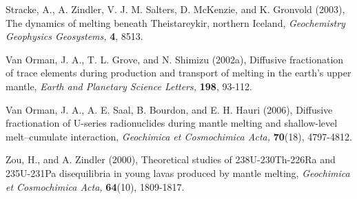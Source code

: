 \documentclass[11pt]{article}
\begin{document}
Stracke, A., A. Zindler, V. J. M. Salters, D. McKenzie, and K. Gronvold
(2003), The dynamics of melting beneath Theistareykir, northern Iceland,
\emph{Geochemistry Geophysics Geosystems,} \textbf{4}, 8513.

Van Orman, J. A., T. L. Grove, and N. Shimizu (2002a), Diffusive
fractionation of trace elements during production and transport of
melting in the earth's upper mantle, \emph{Earth and Planetary Science
Letters,} \textbf{198}, 93-112.

Van Orman, J. A., A. E. Saal, B. Bourdon, and E. H. Hauri (2006),
Diffusive fractionation of U-series radionuclides during mantle melting
and shallow-level melt--cumulate interaction, \emph{Geochimica et
Cosmochimica Acta,} \textbf{70}(18), 4797-4812.

Zou, H., and A. Zindler (2000), Theoretical studies of 238U-230Th-226Ra
and 235U-231Pa disequilibria in young lavas produced by mantle melting,
\emph{Geochimica et Cosmochimica Acta,} \textbf{64}(10), 1809-1817.


    
    
    
\end{document}
